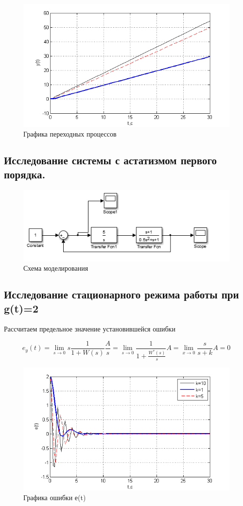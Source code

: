 \documentclass[a4paper, 11pt]{article}
\begin{document}
\begin{figure}[H]
	\centering
	\includegraphics[width=0.7\linewidth]{44}
	\caption{Графика переходных процессов}
	\label{fig:44}
\end{figure}
\clearpage
\begin{center}
\section*{Исследование системы с астатизмом первого порядка.}\hfill\par
\end{center}		
	\begin{figure}[h]
	\center\includegraphics[width=0.6\linewidth]{5}
		\caption{Схема моделирования}
		\label{fig:5}
	\end{figure}

\subsection*{Исследование стационарного режима работы при g(t)=2}\hfill\par
Рассчитаем предельное значение установившейся ошибки

\begin{equation}
{e_y}(t) = \mathop {\lim }\limits_{s \to 0} s\frac{1}{{1 + W(s)}}\frac{A}{s} = \mathop {\lim }\limits_{s \to 0} \frac{1}{{1 + \frac{{{W^*}(s)}}{s}}}A = \mathop {\lim }\limits_{x \to 0} \frac{s}{{s + k}}A = 0
\end{equation}

	\begin{figure}[h]
		\centering
		\includegraphics[width=0.7\linewidth]{7}
		\caption{Графика ошибки е(t)}
		\label{fig:7}
	\end{figure}
\end{document}
